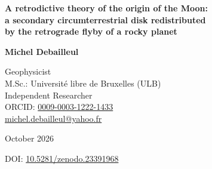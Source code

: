 \documentclass[11pt,a4paper]{article}
\begin{document}
\thispagestyle{empty}
\begin{center}
{\LARGE\bfseries A retrodictive theory of the origin of the Moon:\\[4pt]
a secondary circumterrestrial disk redistributed\\[4pt]
by the retrograde flyby of a rocky planet\par}
\vspace{16pt}
{\large\bfseries Michel Debailleul\par}
\vspace{3pt}
Geophysicist\\
M.Sc.: Universit\'e libre de Bruxelles (ULB)\\
Independent Researcher\\
ORCID: \href{https://orcid.org/0009-0003-1222-1433}{0009-0003-1222-1433}\\
\href{mailto:michel.debailleul@yahoo.fr}{michel.debailleul@yahoo.fr}\par
\vspace{6pt}
October 2026\par
\smallskip DOI: \href{https://doi.org/10.5281/zenodo.23391968}{10.5281/zenodo.23391968}\par
\end{center}
\vspace{4pt}
\end{document}
